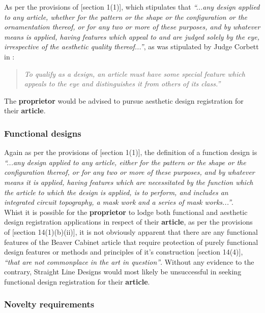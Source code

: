 \documentclass[11pt]{article}
\begin{document}
As per the provisions of [section 1(1)]\cite{rsa93_designs_act}, which stipulates
that \textit{``...any design applied to any article, whether for the
pattern or the shape or the configuration or the ornamentation thereof, or for
any two or more of these purposes, and by whatever means is applied, having
features which appeal to and are judged solely by the eye, irrespective of the
aesthetic quality thereof...''}, as was stipulated by Judge Corbett in
:
\begin{quote}
\textit{To qualify as a design, an article must have some special feature
which appeals to the eye and distinguishes it from others of its class.''}
\end{quote}
The \textbf{proprietor} would be advised to pursue aesthetic design registration for
their \textbf{article}.

\subsubsection{Functional designs}
\label{sec:org4b3ffb8}
Again as per the provisions of [section 1(1)]\cite{rsa93_designs_act}, the
definition of a function design is \textit{``...any design applied to any article,
either for the pattern or the shape or the configuration thereof, or for any two
or more of these purposes, and by whatever means it is applied, having features
which are necessitated by the function which the article to which the design is
applied, is to perform, and includes an integrated circuit topography, a mask
work and a series of mask works...''}.\\

Whist it is possible for the \textbf{proprietor} to lodge both functional and aesthetic
design registration applications in respect of their \textbf{article}, as per the
provisions of [section 14(1)(b)(ii)]\cite{rsa93_designs_act}, it is not obviously
apparent that there are any functional features of the Beaver Cabinet article
that require protection of purely functional design features or methods and
principles of it's construction [section 14(4)]\cite{rsa93_designs_act}, \emph{``that
are not commonplace in the art in question''}. Without any evidence to the
contrary, Straight Line Designs would most likely be unsuccessful in seeking
functional design registration for their \textbf{article}.

\subsubsection{Novelty requirements}
\label{sec:org69097a5}
\end{document}
